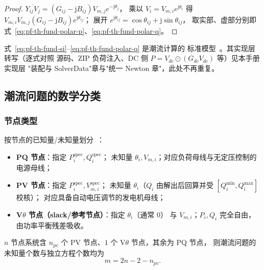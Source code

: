 \begin{proof}
$\overline{Y_{ij}V_j}=(G_{ij}-\mathrm jB_{ij})V_{m,j}e^{-\mathrm j\theta_j}$，
乘以 $V_i=V_{m,i}e^{\mathrm j\theta_i}$ 得
$V_{m,i}V_{m,j}(G_{ij}-\mathrm jB_{ij})e^{\mathrm j\theta_{ij}}$；
展开 $e^{\mathrm j\theta_{ij}}=\cos\theta_{ij}+\mathrm j\sin\theta_{ij}$，
取实部、虚部分别即式~\eqref{eq:pf-th-fund-polar-p}、\eqref{eq:pf-th-fund-polar-q}。
\end{proof}

式~\eqref{eq:pf-th-fund-si}--\eqref{eq:pf-th-fund-polar-q} 是潮流计算的
标准模型~\cite{pff:stagg-elabiad,pff:arrillaga-watson}。其实现层转写（逐式对照
源码、ZIP 负荷注入、DC 侧 $P=V_{dc}\odot(G_{dc}V_{dc})$ 等）见本手册实现层
"装配与 SolverData"章与"统一 Newton 章"，此处不再重复。

\subsection{潮流问题的数学分类}\label{sec:pf-th-fund-classification}

\subsubsection{节点类型}

\begin{definition}[PQ、PV、V$\theta$ 节点]\label{def:pf-th-fund-bus-types}
按节点的已知量/未知量划分~\cite{pff:stott-review}：
\begin{itemize}
  \item \textbf{PQ 节点}：指定 $P_i^{\mathrm{spec}},Q_i^{\mathrm{spec}}$；
        未知量 $\theta_i,V_{m,i}$；对应负荷母线与无定压控制的电源母线；
  \item \textbf{PV 节点}：指定 $P_i^{\mathrm{spec}},V_{m,i}^{\mathrm{spec}}$；
        未知量 $\theta_i$（$Q_i$ 由解出后回算并受 $[Q_i^{\min},Q_i^{\max}]$ 校核）；
        对应具备自动电压调节的发电机母线；
  \item \textbf{V$\theta$ 节点（slack/参考节点）}：指定 $\theta_i$（通常 $0$）
        与 $V_{m,i}$；$P_i,Q_i$ 完全自由，由功率平衡残差吸收。
\end{itemize}
\end{definition}

\begin{proposition}[方程-未知数计数]\label{prop:pf-th-fund-counting}
$n$ 节点系统含 $n_{pv}$ 个 PV 节点、$1$ 个 V$\theta$ 节点，其余为 PQ 节点，
则潮流问题的未知量个数与独立方程个数均为
\begin{equation}
m=2n-2-n_{pv}.
\end{equation}
\end{proposition}

